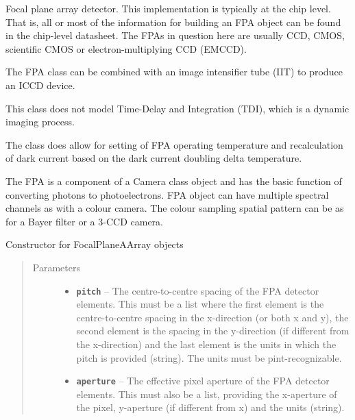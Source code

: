 \documentclass[a4paper,10pt,english]{sphinxmanual}
\begin{document}

\begin{fulllineitems}
\label{packages:electro.FocalPlaneArray}
Focal plane array detector. This implementation is typically at the chip level. That is, all or most of the
information for building an FPA object can be found in the chip-level datasheet. The FPAs in question here
are usually CCD, CMOS, scientific CMOS or electron-multiplying CCD (EMCCD).

The FPA class can be combined with an image intensifier tube (IIT) to produce an ICCD device.

This class does not model Time-Delay and Integration (TDI), which is a dynamic imaging process.

The class does allow for setting of FPA operating temperature and recalculation of dark current
based on the dark current doubling delta temperature.

The FPA is a component of a Camera class object and has the basic function of converting photons to
photoelectrons. FPA object can have multiple spectral channels as with a colour camera. The colour sampling
spatial pattern can be as for a Bayer filter or a 3-CCD camera.

Constructor for FocalPlaneAArray objects
\begin{quote}\begin{description}
\item[{Parameters}] \leavevmode\begin{itemize}
\item {} 
\textbf{\texttt{pitch}} -- The centre-to-centre spacing of the FPA detector elements. This must be a list where the
first element is the centre-to-centre spacing in the x-direction (or both x and y), the second element is
the spacing in the y-direction (if different from the x-direction) and the last element is the units
in which the pitch is provided (string). The units must be pint-recognizable.

\item {} 
\textbf{\texttt{aperture}} -- The effective pixel aperture of the FPA detector elements. This must also be a list, providing
the x-aperture of the pixel, y-aperture (if different from x) and the units (string).


\end{itemize}
\end{description}
\end{quote}
\end{fulllineitems}
\end{document}
